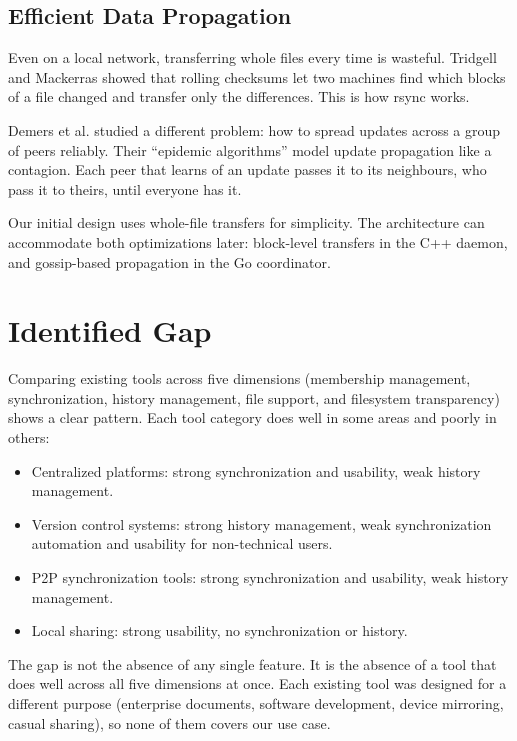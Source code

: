 \subsection{Efficient Data Propagation}

Even on a local network, transferring whole files every time is wasteful. Tridgell and Mackerras \citeyear{rsync1996} showed that rolling checksums let two machines find which blocks of a file changed and transfer only the differences. This is how rsync works.

Demers et al. \citeyear{demers1987} studied a different problem: how to spread updates across a group of peers reliably. Their ``epidemic algorithms'' model update propagation like a contagion. Each peer that learns of an update passes it to its neighbours, who pass it to theirs, until everyone has it.

Our initial design uses whole-file transfers for simplicity. The architecture can accommodate both optimizations later: block-level transfers in the C++ daemon, and gossip-based propagation in the Go coordinator.

\section{Identified Gap}

Comparing existing tools across five dimensions (membership management, synchronization, history management, file support, and filesystem transparency) shows a clear pattern. Each tool category does well in some areas and poorly in others:

\begin{itemize}
    \item Centralized platforms: strong synchronization and usability, weak history management.
    \item Version control systems: strong history management, weak synchronization automation and usability for non-technical users.
    \item P2P synchronization tools: strong synchronization and usability, weak history management.
    \item Local sharing: strong usability, no synchronization or history.
\end{itemize}

The gap is not the absence of any single feature. It is the absence of a tool that does well across all five dimensions at once. Each existing tool was designed for a different purpose (enterprise documents, software development, device mirroring, casual sharing), so none of them covers our use case.

